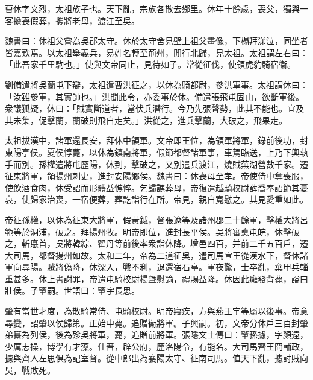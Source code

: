 
\begin{pinyinscope}
曹休字文烈，太祖族子也。天下亂，宗族各散去鄉里。休年十餘歲，喪父，獨與一客擔喪假葬，攜將老母，渡江至吳。

魏書曰：休祖父嘗為吳郡太守。休於太守舍見壁上祖父畫像，下榻拜涕泣，同坐者皆嘉歎焉。以太祖舉義兵，易姓名轉至荊州，閒行北歸，見太祖。太祖謂左右曰：「此吾家千里駒也。」使與文帝同止，見待如子。常從征伐，使領虎豹騎宿衞。

劉備遣將吳蘭屯下辯，太祖遣曹洪征之，以休為騎都尉，參洪軍事。太祖謂休曰：「汝雖參軍，其實帥也。」洪聞此令，亦委事於休。備遣張飛屯固山，欲斷軍後。衆議狐疑，休曰：「賊實斷道者，當伏兵潛行。今乃先張聲勢，此其不能也。宜及其未集，促擊蘭，蘭破則飛自走矣。」洪從之，進兵擊蘭，大破之，飛果走。

太祖拔漢中，諸軍還長安，拜休中領軍。文帝即王位，為領軍將軍，錄前後功，封東陽亭侯。夏侯惇薨，以休為鎮南將軍，假節都督諸軍事，車駕臨送，上乃下輿執手而別。孫權遣將屯歷陽，休到，擊破之，又別遣兵渡江，燒賊蕪湖營數千家。遷征東將軍，領揚州刺史，進封安陽鄉侯。魏書曰：休喪母至孝。帝使侍中奪喪服，使飲酒食肉，休受詔而形體益憔悴。乞歸譙葬母，帝復遣越騎校尉薛喬奉詔節其憂哀，使歸家治喪，一宿便葬，葬訖詣行在所。帝見，親自寬慰之。其見愛重如此。

帝征孫權，以休為征東大將軍，假黃鉞，督張遼等及諸州郡二十餘軍，擊權大將呂範等於洞浦，破之。拜揚州牧。明帝即位，進封長平侯。吳將審悳屯皖，休擊破之，斬悳首，吳將韓綜、翟丹等前後率衆詣休降。增邑四百，并前二千五百戶，遷大司馬，都督揚州如故。太和二年，帝為二道征吳，遣司馬宣王從漢水下，督休諸軍向尋陽。賊將偽降，休深入，戰不利，退還宿石亭。軍夜驚，士卒亂，棄甲兵輜重甚多。休上書謝罪，帝遣屯騎校尉楊曁慰諭，禮賜益隆。休因此癰發背薨，謚曰壯侯。子肇嗣。世語曰：肇字長思。

肇有當世才度，為散騎常侍、屯騎校尉。明帝寢疾，方與燕王宇等屬以後事。帝意尋變，詔肇以侯歸第。正始中薨。追贈衞將軍。子興嗣。初，文帝分休戶三百封肇弟纂為列侯，後為殄吳將軍，薨，追贈前將軍。張隱文士傳曰：肇孫攄，字顏遠，少厲志操，博學有才藻。仕晉，辟公府，歷洛陽令，有能名。大司馬齊王冏輔政，攄與齊人左思俱為記室督。從中郎出為襄陽太守、征南司馬。值天下亂，攄討賊向吳，戰敗死。


\end{pinyinscope}